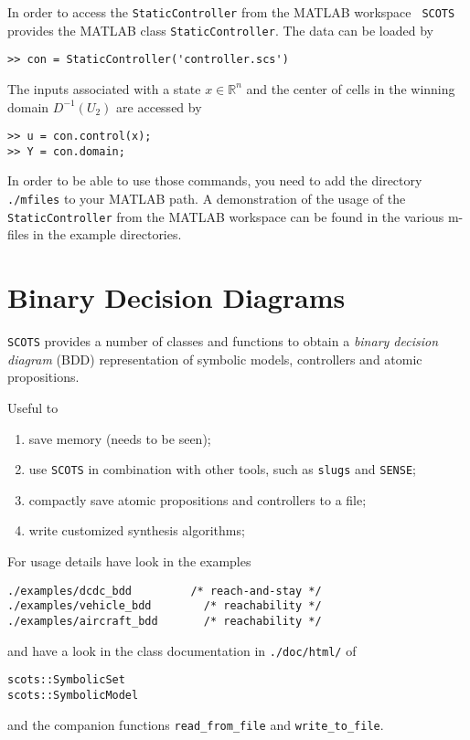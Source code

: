 \documentclass[a4paper]{amsart}
\newcommand{\R}{\mathbb{R}}
\begin{document}
In order to access the {\tt StaticController} from the MATLAB workspace {\tt
SCOTS} provides the MATLAB class {\tt StaticController}. The data can be loaded
by
\begin{lstlisting}[basicstyle=\small\ttfamily]
>> con = StaticController('controller.scs')
\end{lstlisting}
The inputs associated with a state $x\in \R^n$ and the center of cells in the
winning domain $D^{-1}(U_2)$ are accessed by
\begin{lstlisting}[basicstyle=\small\ttfamily]
>> u = con.control(x);
>> Y = con.domain;
\end{lstlisting}
In order to be able to use those commands, you need to add the directory {\tt
./mfiles} to your MATLAB path.
A demonstration of the usage of the {\tt StaticController} from the MATLAB
workspace can be found in the various m-files in the example directories.


\section{Binary Decision Diagrams}

{\tt SCOTS} provides a number of classes and functions to obtain a \emph{binary decision
diagram} (BDD) representation of symbolic models, controllers and atomic
propositions. 


Useful to 
\begin{enumerate}
  \item save memory (needs to be seen);
  \item use {\tt SCOTS} in combination with other tools, such as {\tt slugs} and {\tt SENSE};
  \item compactly save atomic propositions and controllers to a file;
  \item write customized synthesis algorithms;
\end{enumerate}
For usage details have look in the examples
\begin{lstlisting}[basicstyle=\small\ttfamily]
./examples/dcdc_bdd        	/* reach-and-stay */ 
./examples/vehicle_bdd  	  /* reachability */ 
./examples/aircraft_bdd  	  /* reachability */ 
\end{lstlisting}
and have a look in the class documentation in {\tt ./doc/html/} of
\begin{lstlisting}[basicstyle=\small\ttfamily]
scots::SymbolicSet
scots::SymbolicModel
\end{lstlisting}
and the companion functions
{\tt read\_from\_file} and {\tt write\_to\_file}.

%
%




\newpage

\printbibliography
\end{document}
